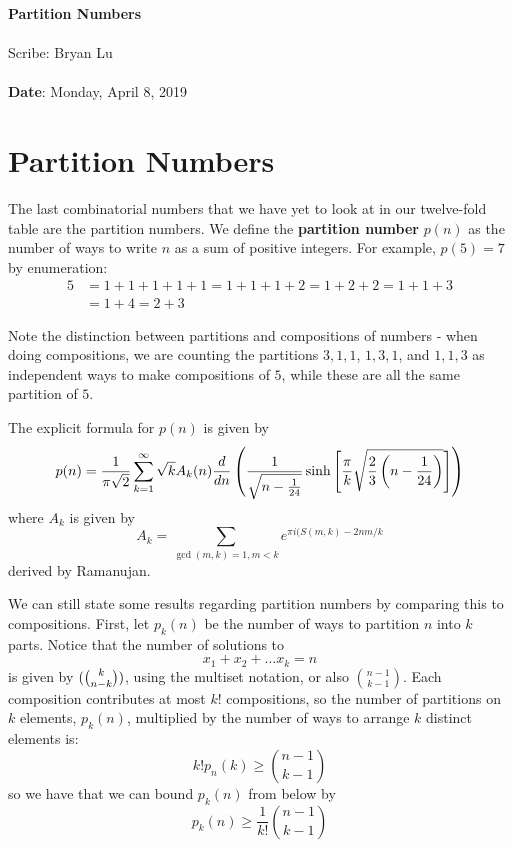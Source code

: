\documentclass[11pt,twosided]{article}
\def\titlestring{Partition Numbers}
\def\scribestring{Bryan Lu}
\def\datestring{Monday, April 8, 2019}
\begin{document}
\thispagestyle{plain}  %

\noindent
{\LARGE \textbf{\titlestring}}\\\\
%
{\Large Scribe: \scribestring}\\ \\
{\textbf{Date}: \datestring}


\noindent

\section{Partition Numbers}
The last combinatorial numbers that we have yet to look at in our twelve-fold table are the partition numbers. We define the \textbf{partition number} $p(n)$ as the number of ways to write $n$ as a sum of positive integers. For example, $p(5) = 7$ by enumeration: 
\begin{align*}
	5 &= 1 + 1 + 1 + 1 + 1 = 1 + 1 + 1 + 2 = 1 + 2 + 2 = 1 + 1 + 3 \\
	&= 1 + 4 = 2 + 3 
\end{align*} 


Note the distinction between partitions and compositions of numbers - when doing compositions, we are counting the partitions $3, 1, 1$, $1, 3, 1$, and $1, 1, 3$ as independent ways to make compositions of $5$, while these are all the same partition of $5$.  

The explicit formula for $p(n)$ is given by 
\[
	p(n) = \frac{1}{\pi\sqrt{2}} \sum_{k=1}^\infty \sqrt{k} A_k(n) \frac{d }{d n}\left( \frac{1}{\sqrt{n - \frac{1}{24}}} \sinh \left[\frac{\pi}{k} \sqrt{\frac{2}{3} \left(n - \frac{1}{24}\right)} \right]\right)
\]
where $A_k$ is given by
\[
	A_k = \sum_{\gcd(m, k) = 1, m < k}e^{\pi i (S(m, k)- 2nm/k}
\]	
derived by Ramanujan.

We can still state some results regarding partition numbers by comparing this to compositions. First, let $p_k(n)$ be the number of ways to partition $n$ into $k$ parts. Notice that the number of solutions to 
\[
	x_1 + x_2 + \ldots x_k = n
\]
is given by $(\tbinom{k}{n-k})$, using the multiset notation, or also $\binom{n-1}{k-1}$. Each composition contributes at most $k!$ compositions, so the number of partitions on $k$ elements, $p_k(n)$, multiplied by the number of ways to arrange $k$ distinct elements is: 
\[
	k! p_n(k) \geq \binom{n-1}{k-1}
\]
so we have that we can bound $p_k(n)$ from below by 
\[
	p_k(n) \geq \frac{1}{k!}\binom{n-1}{k-1}
\]
\end{document}

